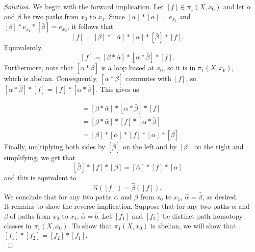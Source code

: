 \documentclass[11pt]{article}
\newenvironment{solution}
  {\renewcommand\qedsymbol{$\blacksquare$}\begin{proof}[Solution]}
  {\end{proof}}
\begin{document}
\begin{solution}
We begin with the forward implication. Let $[f] \in \pi_1(X, x_0)$ and let $\alpha$ and $\beta$ be two paths from $x_0$ to $x_1$. 
Since $[\bar{\alpha}] * [\alpha] = e_{x_1}$ and $[\beta] * e_{x_1} * [\bar{\beta}] = e_{x_0}$, it follows  that
\[
    [f] = [\beta] * [\bar{\alpha}] * [\alpha] * [\bar{\beta}] * [f].
\]
Equivalently,
\[
    [f] = [\beta * \bar{\alpha}] * [\alpha * \bar{\beta}] * [f].
\]
Furthermore, note that $[\alpha * \bar{\beta}]$ is a loop based at $x_0$, so it is in $\pi_1(X, x_0)$, which is abelian. 
Consequently, $[\alpha * \bar{\beta}]$ commutes with $[f]$, so $[\alpha * \bar{\beta}] * [f] = [f] * [\alpha * \bar{\beta}]$. This gives us

\begin{align*}
    [f] &= [\beta * \bar{\alpha}] * [\alpha * \bar{\beta}] * [f] \\
    &= [\beta * \bar{\alpha}] * [f] * [\alpha * \bar{\beta}] \\
    &= [\beta] * [\bar{\alpha}] * [f] * [\alpha] * [\bar{\beta}]
\end{align*}
Finally, multiplying both sides by $[\bar{\beta}]$ on the left and by $[\beta]$ on the right and simplifying, we get that
\[
    [\bar{\beta}] * [f] * [\beta] = [\bar{\alpha}] * [f] * [\alpha]
\]
and this is equivalent to
\[
    \hat{\alpha}([f]) = \hat{\beta}([f]).
\]
We conclude that for any two paths $\alpha$ and $\beta$ from $x_0$ to $x_1$, $\hat{\alpha} = \hat{\beta}$, as desired. \\

It remains to show the reverse implication. Suppose that for any two paths $\alpha$ and $\beta$ of paths from $x_0$ to $x_1$, $\hat{\alpha} = \hat{b}$. Let
$[f_1]$ and $[f_2]$ be distinct path homotopy classes in $\pi_1(X, x_0)$. To show that $\pi_1(X, x_0)$ is abelian, we will show that $[f_1] * [f_2] = [f_2] * [f_1]$. \\


\end{solution}
\end{document}
